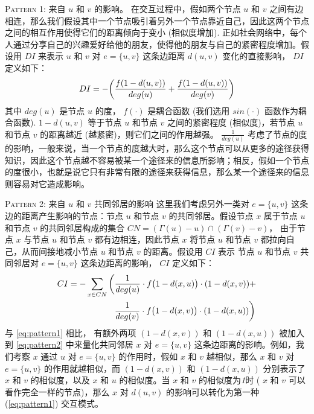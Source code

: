 \vspace{2mm}
\textsc{Pattern 1: 来自 $u$ 和 $v$ 的影响。} 在交互过程中，假如两个节点 $u$ 和 $v$ 之间有边相连，那么我们假设其中一个节点吸引着另外一个节点靠近自己，因此这两个节点之间的相互作用使得它们的距离倾向于变小 (相似度增加). 正如社会网络中，每个人通过分享自己的兴趣爱好给他的朋友，使得他的朋友与自己的紧密程度增加。假设用 $DI$ 来表示 $u$ 和 $v$ 对 $e = \{u,v\}$ 这条边距离 $d(u,v)$ 变化的直接影响， $DI$ 定义如下：
\begin{equation}
\label{eq:pattern1}
DI= -\bigg{(}\frac{f(1-d(u,v))}{deg(u)} + \frac{f(1-d(u,v))}{deg(v)}\bigg{)}
\end{equation}
其中 $deg(u)$ 是节点 $u$ 的度， $f(\cdot)$ 是耦合函数 (我们选用 $sin(\cdot)$ 函数作为耦合函数). $1-d(u,v)$ 等于节点 $u$ 和节点 $v$ 之间的紧密程度 (相似度)，若节点 $u$ 和节点 $v$ 的距离越近 (越紧密)，则它们之间的作用越强。 $\frac{1}{deg(u)}$ 考虑了节点的度的影响，一般来说，当一个节点的度越大时，那么这个节点可以从更多的途径获得知识，因此这个节点越不容易被某一个途径来的信息所影响；相反，假如一个节点的度很小，也就是说它只有非常有限的途径来获得信息，那么某一个途径来的信息则容易对它造成影响。\par
\vspace{2mm}
\textsc{Pattern 2: 来自 $u$ 和 $v$ 共同邻居的影响} 这里我们考虑另外一类对 $e = \{u,v\}$ 这条边的距离产生影响的节点：节点 $u$ 和节点 $v$ 的共同邻居。假设节点 $x$ 属于节点 $u$ 和节点 $v$ 的共同邻居构成的集合 $CN = (\Gamma(u) - u) \cap (\Gamma(v) - v)$， 由于节点 $x$ 与节点 $u$ 和节点 $v$ 都有边相连，因此节点 $x$ 将节点 $u$ 和节点 $v$ 都拉向自己，从而间接地减小节点 $u$ 和节点 $v$ 的距离。假设用 $CI$ 表示 节点 $u$ 和节点 $v$ 共同邻居对 $e = \{u,v\}$ 这条边距离的影响， $CI$ 定义如下：
\begin{equation}
\label{eq:pattern2}
\begin{split}
CI=-\sum_{x \in CN} \bigg{(} &\frac{1}{deg(u)}\cdot f\big{(}1-d(x,u)\big{)} \cdot (1-d(x,v)) + \\
&\frac{1}{deg(v)}\cdot f\big{(}1-d(x,v)\big{)}\cdot (1-d(x,u))\bigg{)}
\end{split}
\end{equation}
\vspace{1mm}
与 \ref{eq:pattern1} 相比， 有额外两项 $(1-d(x,v))$ 和 $(1-d(x,u))$ 被加入到 \ref{eq:pattern2} 中来量化共同邻居 $x$ 对 $e = \{u,v\}$ 这条边距离的影响。例如，我们考察 $x$ 通过 $u$ 对 $e = \{u,v\}$ 的作用时，假如 $x$ 和 $v$ 越相似，那么 $x$ 和 $v$ 对 $e = \{u,v\}$ 的作用就越相似，而 $(1-d(x,v))$ 和 $(1-d(x,u))$ 分别表示了 $x$ 和 $v$ 的相似度，以及 $x$ 和 $u$ 的相似度。当 $x$ 和 $v$ 的相似度为\emph{1}时 ( $x$ 和 $v$ 可以看作完全一样的节点)，那么 $x$ 对 $d(u,v)$ 的影响可以转化为第一种 (\ref{eq:pattern1}) 交互模式。\par
